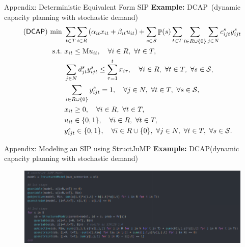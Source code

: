 \documentclass{beamer}
\def\eight{\fontsize{8pt}{8pt}\selectfont}
\newcommand{\structjump}{\textsf{StructJuMP}}
\newcommand{\dcap}{\textsf{DCAP}}
\DeclareMathOperator*{\PP}{\mathbb{P}}
\begin{document}
\begin{frame}[noframenumbering]{Appendix: Deterministic Equivalent Form SIP}
\textbf{Example:} \dcap\ (dynamic capacity planning with stochastic demand)
\eight
\begin{subequations} \label{dcap:formulation}
\begin{align}
\textrm{(\dcap) }\textrm{min}\ &\sum_{t\in T}\sum_{i\in R}\left(\alpha_{it}x_{it}+\beta_{it}u_{it}\right)+\sum_{s\in\mathcal{S}}\PP(s)\sum_{t\in T}\sum_{i\in R\cup\{0\}}\sum_{j\in N}c_{ijt}^{s}y_{ijt}^s	\label{dcap:obj} \\
\textrm{s.t.}\ & x_{it}\le \textrm{M}u_{it},\quad\forall i\in R,\ \forall t\in T,	\label{dcap:b}\\
&\sum_{j\in N}d_{jt}^s y_{ijt}^s\le\sum_{\tau=1}^{t}x_{i\tau},\quad\forall i\in R,\ \forall t\in T,\ \forall s\in\mathcal{S},\label{dcap:c}\\
&\sum_{i\in R\cup \{0\}}y_{ijt}^s=1,\quad\forall j\in N,\ \forall t\in T,\ \forall s\in\mathcal{S}, \label{dcap:d} \\
&x_{it}\ge 0,\quad\forall i\in R,\ \forall t\in T,\label{dcap:e} \\
&u_{it}\in\{0,1\}, \quad\forall i\in R,\ \forall t\in T,\label{dcap:f}\\
&y_{ijt}^s\in\{0,1\},\quad\forall i\in R\cup\{0\},\ \forall j\in N,\ \forall t\in T,\ \forall s\in\mathcal{S}.\label{dcap:g}
\end{align}
\end{subequations}
\end{frame}

\begin{frame}[noframenumbering]{Appendix: Modeling an SIP using \structjump}
\textbf{Example:} \dcap (dynamic capacity planning with stochastic demand)
\begin{figure}
\centering
\includegraphics[width=\textwidth,keepaspectratio]{DCAP_modeling}
\end{figure}
\end{frame}

%
\end{document}
